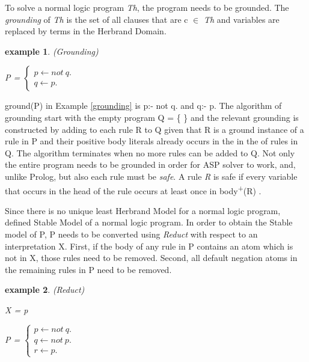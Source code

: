 \documentclass[12pt,twoside]{report}
\newtheorem{examp}{example}[section]
\begin{document}
To solve a normal logic program \textit{Th}, the program needs to be grounded. The \textit{grounding} of \textit{Th} is the set of all clauses that are c $\in$ \textit{Th} and variables are replaced by terms in the Herbrand Domain.

\begin{examp} \normalfont (Grounding)

P = $\begin{cases}
	p  \leftarrow not \ q. \\
	q  \leftarrow p.
      \end{cases}$
\end{examp}
\label{grounding}

ground(P) in Example \ref{grounding} is p:- not q. and q:- p. The algorithm of grounding start with the empty program Q = \{  \} and the relevant grounding is constructed by adding to each rule R to Q given that R is a ground instance of a rule in P and their positive body literals already occurs in the in the of rules in Q. The algorithm terminates when no more rules can be added to Q.
Not only the entire program needs to be grounded in order for ASP solver to work, and, unlike Prolog,  but also each rule must be \textit{safe}. A rule \textit{R} is safe if every variable that occurs in the head of the rule occurs at least once in body\textsuperscript{+}(R) .

Since there is no unique least Herbrand Model for a normal logic program, \cite{Gelfond1988} defined Stable Model of a normal logic program. In order to obtain the Stable model of P, P needs to be converted using \textit{Reduct} with respect to an interpretation X. First, if the body of any rule in P contains an atom which is not in X, those rules need to be removed. Second, all default negation atoms in the remaining rules in P need to be removed.

\begin{examp} \normalfont (Reduct)

X = {p}

P = $\begin{cases}
	p  \leftarrow not\ q. \\
  q  \leftarrow not\ p. \\
  r  \leftarrow p.
      \end{cases}$
\end{examp}
\label{reduct}
\end{document}

